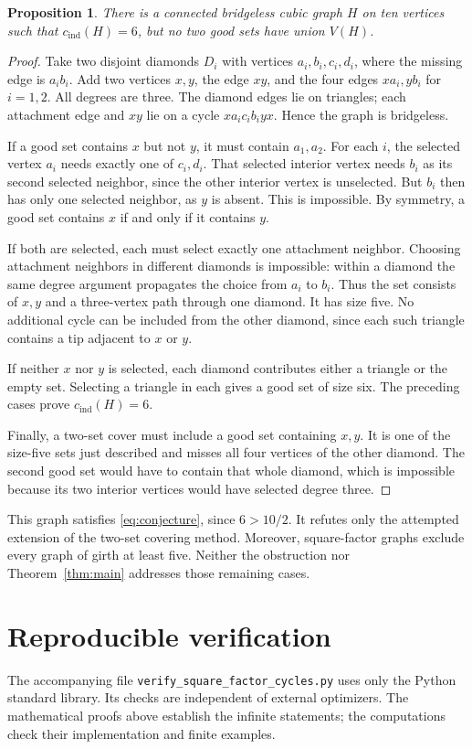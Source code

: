 \documentclass[11pt]{article}
\newtheorem{proposition}[theorem]{Proposition}
\newcommand{\cind}{c_{\mathrm{ind}}}
\begin{document}
\begin{proposition}\label{prop:obstruction}
There is a connected bridgeless cubic graph $H$ on ten vertices such
that $\cind(H)=6$, but no two good sets have union $V(H)$.
\end{proposition}
\begin{proof}
Take two disjoint diamonds $D_i$ with vertices $a_i,b_i,c_i,d_i$,
where the missing edge is $a_ib_i$. Add two vertices $x,y$, the edge
$xy$, and the four edges $xa_i,yb_i$ for $i=1,2$.
All degrees are three. The diamond edges lie on triangles; each
attachment edge and $xy$ lie on a cycle
$x a_i c_i b_i y x$. Hence the graph is bridgeless.

If a good set contains $x$ but not $y$, it must contain $a_1,a_2$.
For each $i$, the selected vertex $a_i$ needs exactly one of $c_i,d_i$.
That selected interior vertex needs $b_i$ as its second selected
neighbor, since the other interior vertex is unselected.
But $b_i$ then has only one selected neighbor, as $y$ is absent.
This is impossible. By symmetry, a good set contains $x$ if and only
if it contains $y$.

If both are selected, each must select exactly one attachment neighbor.
Choosing attachment neighbors in different diamonds is impossible:
within a diamond the same degree argument propagates the choice from
$a_i$ to $b_i$. Thus the set consists of $x,y$ and a three-vertex path
through one diamond. It has size five.
No additional cycle can be included from the other diamond, since
each such triangle contains a tip adjacent to $x$ or $y$.

If neither $x$ nor $y$ is selected, each diamond contributes either a
triangle or the empty set. Selecting a triangle in each gives a good
set of size six. The preceding cases prove $\cind(H)=6$.

Finally, a two-set cover must include a good set containing $x,y$.
It is one of the size-five sets just described and misses all four
vertices of the other diamond. The second good set would have to
contain that whole diamond, which is impossible because its two
interior vertices would have selected degree three.
\end{proof}
This graph satisfies \eqref{eq:conjecture}, since $6>10/2$.
It refutes only the attempted extension of the two-set covering
method. Moreover, square-factor graphs exclude every graph of girth
at least five. Neither the obstruction nor Theorem~\ref{thm:main}
addresses those remaining cases.

\section{Reproducible verification}
The accompanying file
\texttt{verify\_square\_factor\_cycles.py} uses only the Python standard
library. Its checks are independent of external optimizers.
The mathematical proofs above establish the infinite statements;
the computations check their implementation and finite examples.
\end{document}
